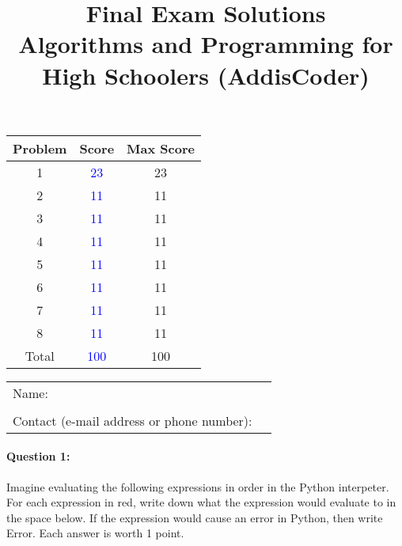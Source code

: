 \documentclass[11pt]{article}
\begin{document}
\title{Final Exam Solutions\\Algorithms and Programming for High Schoolers
  (AddisCoder)}
\date{}

\maketitle

\begin{center}
\begin{tabular}{|c|c|c|}
\hline
Problem & Score & Max Score\\
\hline
1 & \textcolor{blue}{23} & 23\\
\hline
2 & \textcolor{blue}{11} & 11\\
\hline
3 & \textcolor{blue}{11} & 11\\
\hline
4 & \textcolor{blue}{11} & 11\\
\hline
5 & \textcolor{blue}{11} & 11\\
\hline
6 & \textcolor{blue}{11} & 11\\
\hline
7 & \textcolor{blue}{11} & 11\\
\hline
8 & \textcolor{blue}{11} & 11\\
\hline
\hline
Total & \textcolor{blue}{100} & 100\\
\hline
\end{tabular}
\end{center}

\medskip

\begin{center}
\begin{tabular}{ll}
Name: \\
\\
Contact (e-mail address or phone number):
\end{tabular}
\end{center}

\newpage

\paragraph{Question 1:}
Imagine evaluating the following expressions in order in the Python
interpeter.  For each expression in red, write
down what the
expression would evaluate to in the space below.  If the expression
would cause an error in Python, then write Error.  Each answer is
worth 1 point.
\end{document}
